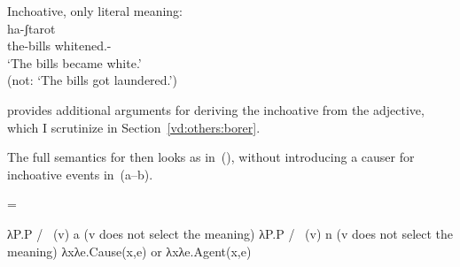\begin{exe}
\begin{xlist}
\begin{xlist}
\begin{exe}
\begin{exe}
\begin{xlist}
\begin{exe}
\begin{xlist}
\begin{exe}
\begin{xlist}
\begin{xlist}
\begin{exe}
\begin{xlist}
\begin{exe}
\begin{xlist}
\begin{exe}
\begin{exe}
\begin{exe}
\begin{xlist}
\begin{exe}
\begin{exe}
\begin{xlist}
 	\ex  Inchoative, only literal meaning: \\
	{ \gll ha-ʃtarot \\
 			  the-bills whitened.-\\
			\glt `The bills became white.'\\
				(not: `The bills got laundered.')
	}		
 \z
 \ex  
 \begin{xlist} 
		
	
		
		
 \z
\z 

\cite{borer91} provides additional arguments for deriving the inchoative from the adjective, which I scrutinize in Section~\ref{vd:others:borer}.

The full semantics for {\vd} then looks as in~(\nextx), without introducing a causer for inchoative events in~(\nextx a--b).
 \begin{exe}
 \ex \label{ex:vd:sem-full} \denote{\vd} =
 \begin{xlist} 
 	\ex  λP.P / \trace~(v) a \hfill (v does not select the meaning) 
 	\ex  λP.P / \trace~(v) n \hfill (v does not select the meaning) 
 	\ex  λxλe.Cause(x,e) or λxλe.Agent(x,e) 
 \z
\z 


\end{xlist}
\end{exe}
\end{xlist}
\end{xlist}
\end{exe}
\end{exe}
\end{xlist}
\end{exe}
\end{exe}
\end{exe}
\end{xlist}
\end{exe}
\end{xlist}
\end{exe}
\end{xlist}
\end{xlist}
\end{exe}
\end{xlist}
\end{exe}
\end{xlist}
\end{exe}
\end{exe}
\end{xlist}
\end{xlist}
\end{exe}
